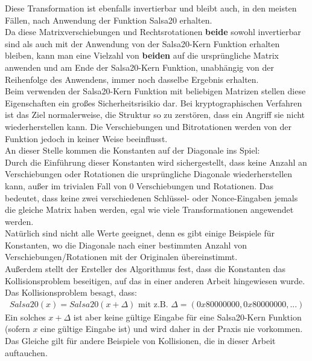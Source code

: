 \documentclass[course=erap]{aspdoc}
\begin{document}
Diese Transformation ist ebenfalls invertierbar und bleibt auch, in den meisten Fällen, nach Anwendung der Funktion Salsa20 erhalten.\cite{salsa20security}
\vspace{1mm}
\\Da diese Matrixverschiebungen und Rechtsrotationen \textbf{beide} sowohl invertierbar sind als auch mit der Anwendung von der Salsa20-Kern Funktion erhalten bleiben,
kann man eine Vielzahl von \textbf{beiden} auf die ursprüngliche Matrix anwenden und am Ende der Salsa20-Kern Funktion, unabhängig von der Reihenfolge des Anwendens, immer noch dasselbe Ergebnis erhalten.
\vspace{1mm}
\\Beim verwenden der Salsa20-Kern Funktion mit beliebigen Matrizen stellen diese Eigenschaften ein großes Sicherheitsrisikio dar.
Bei kryptographischen Verfahren ist das Ziel normalerweise, die Struktur so zu zerstören, dass ein Angriff sie nicht wiederherstellen kann.
Die Verschiebungen und Bitrotationen werden von der Funktion jedoch in keiner Weise beeinflusst.
\vspace{1mm}
\\An dieser Stelle kommen die Konstanten auf der Diagonale ins Spiel:
\vspace{2mm}
\\Durch die Einführung dieser Konstanten wird sichergestellt, dass keine Anzahl an Verschiebungen oder Rotationen die ursprüngliche Diagonale wiederherstellen kann,
außer im trivialen Fall von 0 Verschiebungen und Rotationen. Das bedeutet, dass keine zwei verschiedenen Schlüssel- oder Nonce-Eingaben
jemals die gleiche Matrix haben werden, egal wie viele Transformationen angewendet werden.\cite{salsa20security}
\vspace{1mm}
\\Natürlich sind nicht alle Werte geeignet, denn es gibt einige Beispiele für Konstanten,
wo die Diagonale nach einer bestimmten Anzahl von Verschiebungen/Rotationen mit der Originalen übereinstimmt.
\vspace{1mm}
\\Außerdem stellt der Ersteller des Algorithmus fest\cite{ResponseOnTheSalsa20Core}, dass die Konstanten das Kollisionsproblem beseitigen,
auf das in einer anderen Arbeit\cite{onTheSalsa20Core} hingewiesen wurde.\\
Das Kollisionsproblem besagt, dass:
\begin{gather*} Salsa20(x) = Salsa20(x + \Delta) \text{  mit z.B.  } \Delta=(0x80000000,0x80000000,...) \end{gather*}
Ein solches $x+\Delta$ ist aber keine gültige Eingabe für eine Salsa20-Kern Funktion (sofern $x$ eine gültige Eingabe ist) und wird daher in der Praxis nie vorkommen.
Das Gleiche gilt für andere Beispiele von Kollisionen, die in dieser Arbeit auftauchen.
\end{document}
